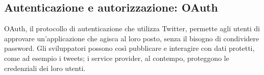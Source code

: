 	\subsection{Autenticazione e autorizzazione: OAuth}
		OAuth, il protocollo di autenticazione che utilizza Twitter\cite{twitter_auth}, permette agli utenti di approvare un'applicazione che agisca al loro posto, senza il bisogno di condividere password. Gli sviluppatori possono così pubblicare e interagire con dati protetti, come ad esempio i tweets; i service provider, al contempo, proteggono le credenziali dei loro utenti\cite{twitter_aut_faq}.
